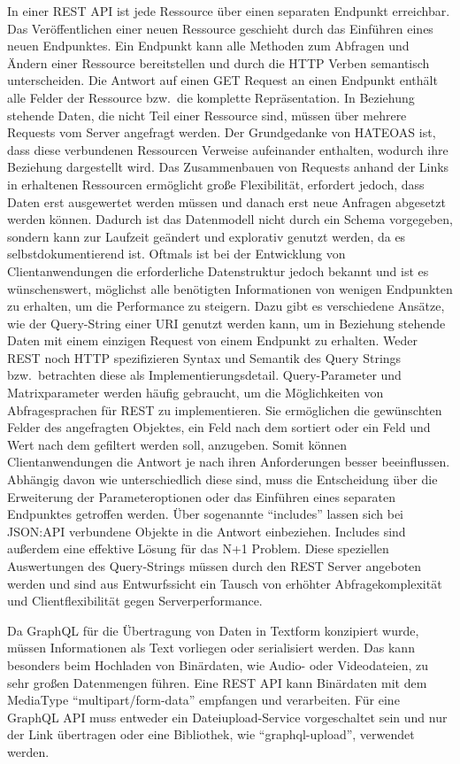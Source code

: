 In einer REST API ist jede Ressource über einen separaten Endpunkt erreichbar.
Das Veröffentlichen einer neuen Ressource geschieht durch das Einführen eines neuen Endpunktes.
Ein Endpunkt kann alle Methoden zum Abfragen und Ändern einer Ressource bereitstellen und durch die HTTP Verben semantisch unterscheiden.
Die Antwort auf einen GET Request an einen Endpunkt enthält alle Felder der Ressource bzw.\ die komplette Repräsentation.
In Beziehung stehende Daten, die nicht Teil einer Ressource sind, müssen über mehrere Requests vom Server angefragt werden.
Der Grundgedanke von HATEOAS ist, dass diese verbundenen Ressourcen Verweise aufeinander enthalten, wodurch ihre Beziehung dargestellt wird.
Das Zusammenbauen von Requests anhand der Links in erhaltenen Ressourcen ermöglicht große Flexibilität, erfordert jedoch, dass Daten erst ausgewertet werden müssen und danach erst neue Anfragen abgesetzt werden können.
Dadurch ist das Datenmodell nicht durch ein Schema vorgegeben, sondern kann zur Laufzeit geändert und explorativ genutzt werden, da es selbstdokumentierend ist.
Oftmals ist bei der Entwicklung von Clientanwendungen die erforderliche Datenstruktur jedoch bekannt und ist es wünschenswert, möglichst alle benötigten Informationen von wenigen Endpunkten zu erhalten, um die Performance zu steigern.
Dazu gibt es verschiedene Ansätze, wie der Query-String einer URI genutzt werden kann, um in Beziehung stehende Daten mit einem einzigen Request von einem Endpunkt zu erhalten.
Weder REST noch HTTP spezifizieren Syntax und Semantik des Query Strings bzw.\ betrachten diese als Implementierungsdetail.
Query-Parameter und Matrixparameter werden häufig gebraucht, um die Möglichkeiten von Abfragesprachen für REST zu implementieren.
Sie ermöglichen \zB{} die gewünschten Felder des angefragten Objektes, ein Feld nach dem sortiert oder ein Feld und Wert nach dem gefiltert werden soll, anzugeben.
Somit können Clientanwendungen die Antwort je nach ihren Anforderungen besser beeinflussen.
Abhängig davon wie unterschiedlich diese sind, muss die Entscheidung über die Erweiterung der Parameteroptionen oder das Einführen eines separaten Endpunktes getroffen werden.
Über sogenannte \enquote{includes} lassen sich bei JSON:API verbundene Objekte in die Antwort einbeziehen.
Includes sind außerdem eine effektive Lösung für das N+1 Problem.
Diese speziellen Auswertungen des Query-Strings müssen durch den REST Server angeboten werden und sind aus Entwurfssicht ein Tausch von erhöhter Abfragekomplexität und Clientflexibilität gegen Serverperformance.
\par
Da GraphQL für die Übertragung von Daten in Textform konzipiert wurde, müssen Informationen als Text vorliegen oder serialisiert werden.
Das kann besonders beim Hochladen von Binärdaten, wie Audio- oder Videodateien, zu sehr großen Datenmengen führen.
Eine REST API kann Binärdaten mit dem MediaType \enquote{multipart/form-data} empfangen und verarbeiten.
Für eine GraphQL API muss entweder ein Dateiupload-Service vorgeschaltet sein und nur der Link übertragen oder eine Bibliothek, wie \enquote{graphql-upload}, verwendet werden.

